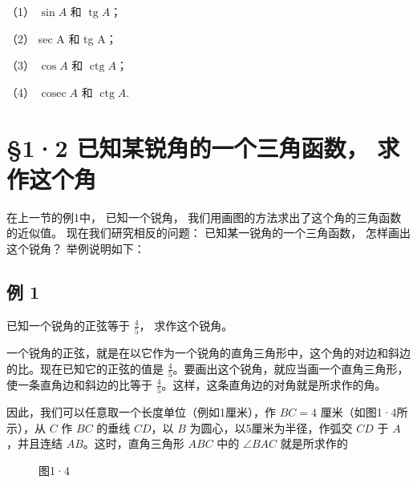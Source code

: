 （1） \(\sin A\) 和 \(\operatorname{tg} A\)；

（2） sec A 和 tg A；

（3） \(\cos A\) 和 \(\operatorname{ctg} A\)；

（4） \(\operatorname{cosec} A\) 和 \(\operatorname{ctg} A\).

\section{§1·2 已知某锐角的一个三角函数， 求作这个角}

在上一节的例1中， 已知一个锐角，
我们用画图的方法求出了这个角的三角函数的近似值。
现在我们研究相反的问题： 已知某一锐角的一个三角函数， 怎样画出这个锐角？
举例说明如下：

\subsection{例 1}

已知一个锐角的正弦等于 \(\frac{4}{5}\)， 求作这个锐角。

一个锐角的正弦，就是在以它作为一个锐角的直角三角形中，这个角的对边和斜边的比。现在已知它的正弦的值是
\(\frac{4}{5}\)。要画出这个锐角，就应当画一个直角三角形，使一条直角边和斜边的比等于
\(\frac{4}{5}\)。这样，这条直角边的对角就是所求作的角。

因此，我们可以任意取一个长度单位（例如1厘米），作 \(BC = 4\)
厘米（如图1·4所示），从 \(C\) 作 \(BC\) 的垂线 \(CD\)，以 \(B\)
为圆心，以5厘米为半径，作弧交 \(CD\) 于 \(A\)，并且连结
\(AB\)。这时，直角三角形 \(ABC\) 中的 \(\angle BAC\) 就是所求作的

\begin{figure}
\centering
{}
\caption{图1·4}
\end{figure}


